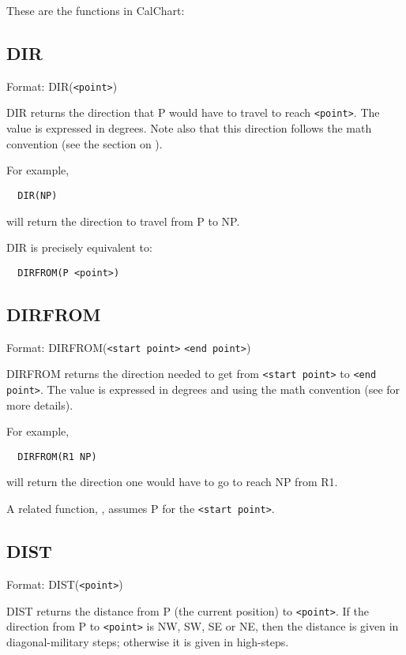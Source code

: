 These are the functions in CalChart:

\subsection{DIR}\label{dir}

Format: DIR(\verb$<point>$)

DIR returns the direction that P would have to travel to reach \verb$<point>$.
The value is expressed in degrees.  Note also that this direction follows
the math convention (see the section on ).

For example,
\begin{verbatim}
  DIR(NP)
\end{verbatim}
will return the direction to travel from P to NP.

DIR is precisely equivalent to:
\begin{verbatim}
  DIRFROM(P <point>)
\end{verbatim}

\subsection{DIRFROM}\label{dirfrom}

Format: DIRFROM(\verb$<start point>$ \verb$<end point>$)

DIRFROM returns the direction needed to get from \verb$<start point>$ to
\verb$<end point>$. The value is expressed in degrees and using the math
convention (see  for more details).

For example,
\begin{verbatim}
  DIRFROM(R1 NP)
\end{verbatim}
will return the direction one would have to go to reach NP from R1.

A related function, , assumes P for the \verb$<start point>$.

\subsection{DIST}\label{dist}

Format: DIST(\verb$<point>$)

DIST returns the distance from P (the current position) to \verb$<point>$.
If the direction from P to \verb$<point>$ is NW, SW, SE or NE, then the
distance is given in diagonal-military steps; otherwise it is given in
high-steps.

